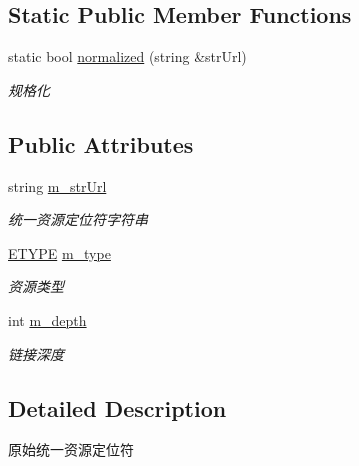 \subsection*{Static Public Member Functions}
\begin{DoxyCompactItemize}
\item 
static bool \hyperlink{class_raw_url_a12963416c125786ab585feed5a06fb19}{normalized} (string \&str\+Url)
\begin{DoxyCompactList}\small\item\em 规格化 \end{DoxyCompactList}\end{DoxyCompactItemize}
\subsection*{Public Attributes}
\begin{DoxyCompactItemize}
\item 
\mbox{\label{class_raw_url_a58c17cc7793b26cd672fa95cf1cad1b7}} 
string \hyperlink{class_raw_url_a58c17cc7793b26cd672fa95cf1cad1b7}{m\+\_\+str\+Url}
\begin{DoxyCompactList}\small\item\em 统一资源定位符字符串 \end{DoxyCompactList}\item 
\mbox{\label{class_raw_url_aa4e0c2141471709af7b27af11b7d9568}} 
\hyperlink{class_raw_url_a6d7469b7f73d43e86e68d8c4182a7a51}{E\+T\+Y\+PE} \hyperlink{class_raw_url_aa4e0c2141471709af7b27af11b7d9568}{m\+\_\+type}
\begin{DoxyCompactList}\small\item\em 资源类型 \end{DoxyCompactList}\item 
\mbox{\label{class_raw_url_aedd7e8ab35d070011a140d7466e2d25b}} 
int \hyperlink{class_raw_url_aedd7e8ab35d070011a140d7466e2d25b}{m\+\_\+depth}
\begin{DoxyCompactList}\small\item\em 链接深度 \end{DoxyCompactList}\end{DoxyCompactItemize}


\subsection{Detailed Description}
原始统一资源定位符 

